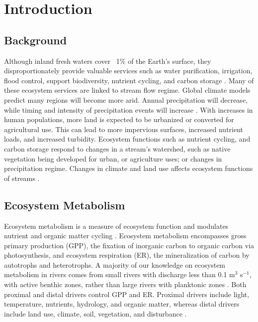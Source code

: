 %
% 

\chapter[INTRODUCTION]{Introduction}

\vspace{-12pt}
\section{Background}

Although inland fresh waters cover ~1\% of the Earth's surface, they disproportionately provide valuable services such as water purification, irrigation, flood control, support biodiversity, nutrient cycling, and carbon storage \cite{williamson_lakes_2008, palmerEcologyHeartbeatEcosystems2012}. Many of these ecosystem services are linked to stream flow regime. Global climate models predict many regions will become more arid. Annual precipitation will decrease, while timing and intensity of precipitation events will increase \cite{IPCC}. With increases in human populations, more land is expected to be urbanized or converted for agricultural use. This can lead to more impervious surfaces, increased nutrient loads, and increased turbidity. Ecosystem functions such as nutrient cycling, and carbon storage respond to changes in a stream’s watershed, such as native vegetation being developed for urban, or agriculture uses; or changes in precipitation regime. Changes in climate and land use affects ecosystem functions of streams \cite{grimm_changing_2008}.


\section{Ecosystem Metabolism}
Ecosystem metabolism is a measure of ecosystem function and modulates nutrient and organic matter cycling \cite{izagirre_environmental_2008, williamson_lakes_2008}. Ecosystem metabolism encompasses gross primary production (GPP), the fixation of inorganic carbon to organic carbon via photosynthesis, and ecosystem respiration (ER), the mineralization of carbon by autotrophs and heterotrophs. A majority of our knowledge on ecosystem metabolism in rivers comes from small rivers with discharge less than 0.1 m$^3$ s$^{-1}$, with active benthic zones, rather than large rivers with planktonic zones \cite{hall_metabolism_2016, bernhardt_metabolic_2018}. 
Both proximal and distal drivers control GPP and ER. Proximal drivers include light, temperature, nutrients, hydrology, and organic matter, whereas distal drivers include land use, climate, soil, vegetation, and disturbance \cite{izagirre_environmental_2008, bernot_inter-regional_2010}. 

